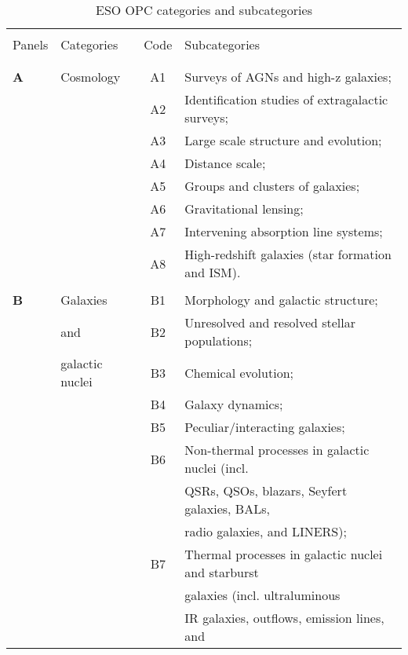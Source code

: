 \documentclass{article}
\begin{document}
\begin{table}[p]
\caption{ESO OPC categories and subcategories}
\label{tab:categories}
\medskip
{\small\sf
\begin{center}
\begin{tabular}{llcl} 
\hline\hline
& & & \\
Panels & Categories & Code & Subcategories \\
& & & \\
\hline 
& & & \\[-6pt]
{\bf A}& Cosmology & A1 & Surveys of AGNs and high-z galaxies; \\
       &           & A2 & Identification studies of extragalactic surveys; \\
       &           & A3 & Large scale structure and evolution; \\
       &           & A4 & Distance scale; \\  
       &           & A5 & Groups and clusters of galaxies; \\  
       &           & A6 & Gravitational lensing; \\  
       &           & A7 & Intervening absorption line systems; \\  
       &           & A8 & High-redshift galaxies (star formation and ISM). \\[4pt]
\hline
& & & \\[-6pt]
{\bf B}& Galaxies  & B1 & Morphology and galactic structure; \\  
       & and       & B2 & Unresolved and resolved stellar populations; \\  
       & galactic nuclei & B3 & Chemical evolution; \\  
       &           & B4 & Galaxy dynamics; \\  
       &           & B5 & Peculiar/interacting galaxies; \\   
       &           & B6 & Non-thermal processes in galactic nuclei (incl. \\
       &           &    &  QSRs, QSOs, blazars, Seyfert galaxies, BALs, \\ 
       &           &    &  radio galaxies, and LINERS); \\  
       &           & B7 & Thermal processes in galactic nuclei and starburst\\
       &           &    &  galaxies (incl. ultraluminous \\  
       &           &    &  IR galaxies, outflows, emission lines, and \\

\end{tabular}
\end{center}}
\end{table}
\end{document}
